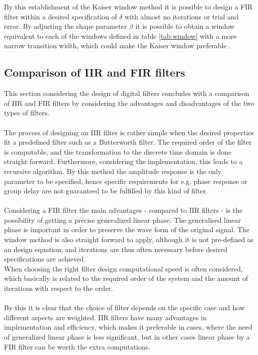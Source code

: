 By this establishment of the Kaiser window method it is possible to design a FIR filter within a desired specification of $\delta$ with almost no iterations or trial and error. By adjusting the shape parameter $\beta$ it is possible to obtain a window equivalent to each of the windows defined in table \ref{tab:window} with a more narrow transition width, which could make the Kaiser window preferable .       

\subsection{Comparison of IIR and FIR filters}
This section considering the design of digital filters concludes with a comparison of IIR and FIR filters by considering the advantages and disadvantages of the two types of filters.
\\ \\
The process of designing an IIR filter is rather simple when the desired properties fit a predefined filter such as a Butterworth filter. The required order of the filter is computable, and the transformation to the discrete time domain is done straight forward. Furthermore, considering the implementation, this leads to a recursive algorithm. By this method the amplitude response is the only parameter to be specified, hence specific requirements for e.g. phase response or group delay are not guaranteed to be fulfilled by this kind of filter. \\ \\
Considering a FIR filter the main advantages - compared to IIR filters - is the possibility of getting a precise generalized linear phase. The generalised linear phase is important in order to preserve the wave form of the original signal.  
The window method is also straight forward to apply, although it is not pre-defined as an design equation, and iterations are thus often necessary before desired specifications are achieved. \\
When choosing the right filter design computational speed is often considered, which basically is related to the required order of the system and the amount of iterations with respect to the order. \\
\\
By this it is clear that the choice of filter depends on the specific case and how different aspects are weighted. IIR filters have many advantages in implementation and efficiency, which makes it preferable in cases, where the need of generalized linear phase is less significant, but in other cases linear phase by a FIR filter can be worth the extra computations.
